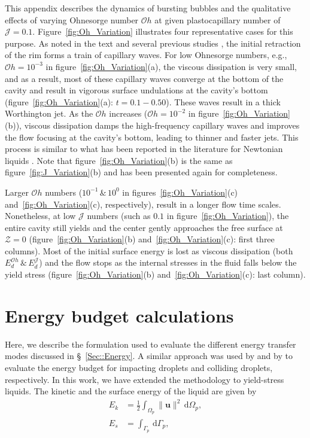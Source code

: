 \documentclass[final]{jfm}
\begin{document}
This appendix describes the dynamics of bursting bubbles and the qualitative effects of varying Ohnesorge number $\mathcal{O}h$ at given plastocapillary number of $\mathcal{J}=0.1$. Figure~\ref{fig:Oh_Variation} illustrates four representative cases for this purpose. As noted in the text and several previous studies \citep{duchemin2002jet, deike2018dynamics, gordillo2019capillary}, the initial retraction of the rim forms a train of capillary waves. For low Ohnesorge numbers, e.g., $\mathcal{O}h = 10^{-3}$ in figure~\ref{fig:Oh_Variation}(a), the viscous dissipation is very small, and as a result, most of these capillary waves converge at the bottom of the cavity and result in vigorous surface undulations at the cavity's bottom (figure~\ref{fig:Oh_Variation}(a): $ t = 0.1 - 0.50$). These waves result in a thick Worthington jet. As the $\mathcal{O}h$ increases ($\mathcal{O}h = 10^{-2}$ in figure~\ref{fig:Oh_Variation}(b)), viscous dissipation damps the high-frequency capillary waves and improves the flow focusing at the cavity's bottom, leading to thinner and faster jets. This process is similar to what has been reported in the literature for Newtonian liquids \citep{duchemin2002jet, ghabache2014physics, deike2018dynamics}. Note that figure~\ref{fig:Oh_Variation}(b) is the same as figure~\ref{fig:J_Variation}(b) and has been presented again for completeness. 

Larger $\mathcal{O}h$ numbers ($10^{-1}\,\&\,10^{0}$ in figures~\ref{fig:Oh_Variation}(c) and~\ref{fig:Oh_Variation}(c), respectively), result in a longer flow time scales.	Nonetheless, at low $\mathcal{J}$ numbers (such as $0.1$ in figure~\ref{fig:Oh_Variation}), the entire cavity still yields and the center gently approaches the free surface at $\mathcal{Z} = 0$ (figure~\ref{fig:Oh_Variation}(b) and~\ref{fig:Oh_Variation}(c): first three columns). Most of the initial surface energy is lost as viscous dissipation (both $E_d^{\mathcal{O}h}\,\&\, E_d^{\mathcal{J}}$) and the flow stops as the internal stresses in the fluid falls below the yield stress (figure~\ref{fig:Oh_Variation}(b) and~\ref{fig:Oh_Variation}(c): last column).

\section{Energy budget calculations}\label{App::EnergyBudgetApp}
Here, we describe the formulation used to evaluate the different energy transfer modes discussed in \S~\ref{Sec::Energy}. A similar approach was used by \citet{wildeman2016spreading} and by \citet{ramirez2020lifting} to evaluate the energy budget for impacting droplets and colliding droplets, respectively. In this work, we have extended the methodology to yield-stress liquids. The kinetic and the surface energy of the liquid are given by
\begin{align}
	\label{Eqn::Ek}
	E_k &= \frac{1}{2}\int_{\Omega_p}\|\boldsymbol{u}\|^2\,\mathrm{d}\Omega_p,\\
	\label{Eqn::Es}
	E_s &= \int_{\Gamma_p}\,\mathrm{d}\Gamma_p,
\end{align}
\end{document}
